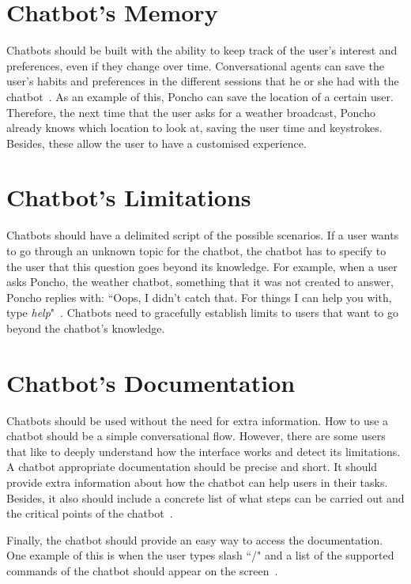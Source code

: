 \documentclass[a4paper,10pt]{article}
\begin{document}
\section{Chatbot's Memory}

Chatbots should be built with the ability to keep track of the user's interest and preferences, even if they change over time. Conversational agents can save the user's habits and preferences in the different sessions that he or she had with the chatbot~\cite{shneiderman1997direct}. As an example of this, Poncho can save the location of a certain user. Therefore, the next time that the user asks for a weather broadcast, Poncho already knows which location to look at, saving the user time and keystrokes. Besides, these allow the user to have a customised experience. 


\section{Chatbot's Limitations}

Chatbots should have a delimited script of the possible scenarios. If a user wants to go through an unknown topic for the chatbot, the chatbot has to specify to the user that this question goes beyond its knowledge. For example, when a user asks Poncho, the weather chatbot, something that it was not created to answer, Poncho replies with: ``Oops, I didn't catch that. For things I can help you with, type \textit{help}"~\cite{HeuristicsWebPage}. Chatbots need to gracefully establish limits to users that want to go beyond the chatbot's knowledge.  

\section{Chatbot's Documentation}

Chatbots should be used without the need for extra information. How to use a chatbot should be a simple conversational flow. However, there are some users that like to deeply understand how the interface works and detect its limitations. A chatbot appropriate documentation should be precise and short. It should provide extra information about how the chatbot can help users in their tasks. Besides, it also should include a concrete list of what steps can be carried out and the critical points of the chatbot~\cite{HeuristicsWebPage}. 

Finally, the chatbot should provide an easy way to access the documentation. One example of this is when the user types slash ``/" and a list of the supported commands of the chatbot should appear on the screen~\cite{botfather}.  


\medskip


\end{document}
